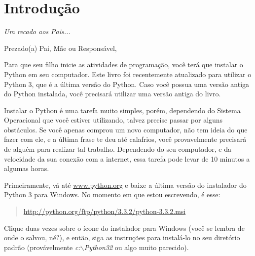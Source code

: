 

\chapter*{Introdução}\normalsize
\begin{center}
{\em Um recado aos Pais...}
\end{center}
\pagestyle{plain}

\noindent
Prezado(a) Pai, Mãe ou Responsável,

Para que seu filho inicie as atividades de programação, você terá que instalar o Python em seu computador. Este livro foi recentemente atualizado para utilizar o Python 3, que é a última versão do Python. Caso você possua uma versão antiga do Python instalada, você precisará utilizar uma versão antiga do livro.

Instalar o Python é uma tarefa muito simples, porém, dependendo do Sistema Operacional que você estiver utilizando, talvez precise passar por alguns obstáculos. Se você apenas comprou um novo computador, não tem ideia do que fazer com ele, e a última frase te deu até calafrios, você provavelmente precisará de alguém para realizar tal trabalho. Dependendo do seu computador, e da velocidade da sua conexão com a internet, essa tarefa pode levar de 10 minutos a algumas horas.

\begin{WINDOWS}

\noindent
Primeiramente, vá até \href{http://www.python.org}{www.python.org} e baixe a última versão do instalador do Python 3 para Windows. No momento em que estou escrevendo, é esse:
\begin{quote}
     \href{http://python.org/ftp/python/3.3.2/python-3.3.2.msi}{http://python.org/ftp/python/3.3.2/python-3.3.2.msi}
\end{quote}
Clique duas vezes sobre o ícone do instalador para Windows (você se lembra de onde o salvou, né?), e então, siga as instruções para instalá-lo no seu diretório padrão (provávelmente \emph{c:$\backslash$Python32} ou algo muito parecido).

\end{WINDOWS}

